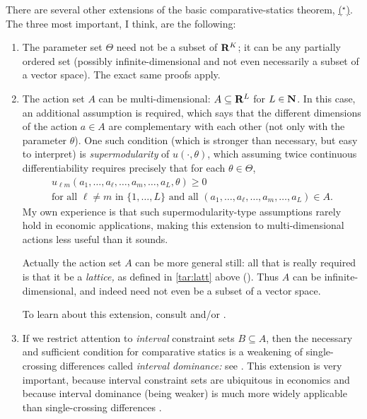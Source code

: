 There are several other extensions of the basic comparative-statics theorem, \hyperref[theorem:topkis_ms_converse]{($^\star$)}. The three most important, I think, are the following:

\begin{enumerate}

	\item The parameter set $\Theta$ need not be a subset of $\mathbf{R}^K$; it can be any partially ordered set (possibly infinite-dimensional and not even necessarily a subset of a vector space). The exact same proofs apply.

	\item The action set $A$ can be multi-dimensional: $A \subseteq \mathbf{R}^L$ for $L \in \mathbf{N}$. In this case, an additional assumption is required, which says that the different dimensions of the action $a \in A$ are complementary with each other (not only with the parameter $\theta$). One such condition (which is stronger than necessary, but easy to interpret) is \emph{supermodularity} of $u(\cdot,\theta)$, which assuming twice continuous differentiability requires precisely that for each $\theta \in \Theta$,
	\begin{multline*}
		u_{\ell m}(a_1,\dots,a_\ell,\dots,a_m,\dots,a_L,\theta) \geq 0
		\\
		\text{for all $\ell \neq m$ in $\{1,\dots,L\}$ and all $(a_1,\dots,a_\ell,\dots,a_m,\dots,a_L) \in A$.}
	\end{multline*}
	My own experience is that such supermodularity-type assumptions rarely hold in economic applications, making this extension to multi-dimensional actions less useful than it sounds.

	Actually the action set $A$ can be more general still: all that is really required is that it be a \emph{lattice,} as defined in \cref{tar:latt} above (). Thus $A$ can be infinite-dimensional, and indeed need not even be a subset of a vector space.

	To learn about this extension, consult \textcite[sections~1.3 and 2.2]{Sarver2023} and/or \textcite{MilgromShannon1994}.

	\item If we restrict attention to \emph{interval} constraint sets $B \subseteq A$, then the necessary and sufficient condition for comparative statics is a weakening of single-crossing differences called \emph{interval dominance:} see \textcite{QuahStrulovici2009}. This extension is very important, because interval constraint sets are ubiquitous in economics and because interval dominance (being weaker) is much more widely applicable than single-crossing differences \parencite[see e.g.][]{QuahStrulovici2013,SmithSorensenTian2021,Tian2022,Valenzuelastookey2022,csp}.


\end{enumerate}



